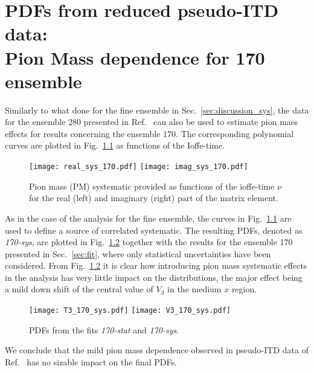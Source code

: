 \chapter{PDFs from reduced pseudo-ITD data:  \\ Pion Mass dependence for 170 ensemble}
Similarly to what done for the fine ensemble in Sec.~\ref{sec:discussion_sys},
the data for the ensemble 280 presented in Ref.~\cite{Joo:2020spy} can also be used to estimate pion mass effects
for results concerning the ensemble 170. The corresponding polynomial curves are plotted in Fig.~\ref{fig:sys_170}
as functions of the Ioffe-time.
\begin{figure}[h!]
    \centering
    \texttt{[image: real\_sys\_170.pdf]}  
    \texttt{[image: imag\_sys\_170.pdf]}
\caption{Pion mass (PM) systematic provided 
as functions of the ioffe-time $\nu$ for the real (left) and imaginary (right) part 
of the matrix element.}
\label{fig:sys_170}
\end{figure}

%
As in the case of the analysis for the fine ensemble, the curves in Fig.~\ref{fig:sys_170} are used 
to define a source of correlated systematic. The resulting PDFs, denoted as \textit{170-sys}, are 
plotted in Fig.~\ref{fig:res_170_sys} together with the results for the ensemble 170 presented in Sec.~\ref{sec:fit},
where only statistical uncertainties have been considered.
From Fig.~\ref{fig:res_170_sys} it is clear how introducing pion mass systematic effects in the analysis has very little impact on
the distributions, the major effect being a mild down shift of the central value of $V_3$ in the medium $x$ region.
\begin{figure}[h!]
    \centering
    \texttt{[image: T3\_170\_sys.pdf]}  
    \texttt{[image: V3\_170\_sys.pdf]}
\caption{PDFs from the fits \textit{170-stat} and \textit{170-sys}.}
\label{fig:res_170_sys}
\end{figure}
We conclude that the mild pion mass dependence observed in pseudo-ITD data of Ref.~\cite{Joo:2020spy} has no sizable impact
on the final PDFs.
